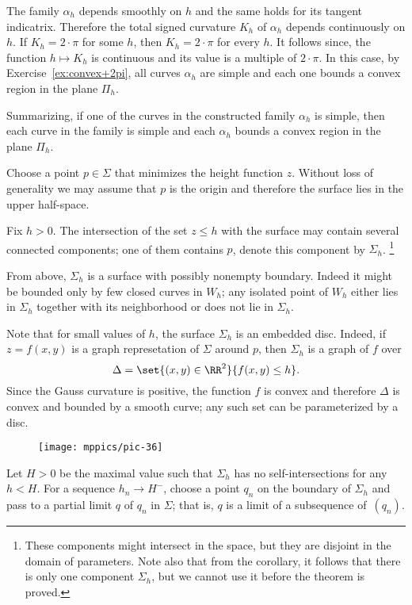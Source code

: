 The family $\alpha_h$ depends smoothly on $h$ and the same holds for its tangent indicatrix.
Therefore the total signed curvature $K_h$ of $\alpha_h$ depends continuously on $h$.
If $K_h=2\cdot\pi$ for some $h$, then $K_h=2\cdot\pi$ for every $h$.
It follows since, the function $h\mapsto K_h$ is continuous and its value is a multiple of $2\cdot\pi$.
In this case, by Exercise~\ref{ex:convex+2pi}, all curves $\alpha_h$ are simple and each one bounds a convex region in the plane $\Pi_h$.

Summarizing, if one of the curves in the constructed family $\alpha_{h}$ is simple,
then each curve in the family is simple and each $\alpha_{h}$ bounds a convex region in the plane $\Pi_h$. 

Choose a point $p\in \Sigma$ that minimizes the height function $z$.
Without loss of generality we may assume that $p$ is the origin and therefore the surface lies in the upper half-space.

Fix $h>0$.
The intersection of the set $z\le h$ with the surface may contain several connected components;
one of them contains $p$, denote this component by $\Sigma_h$.%
\footnote{These components might intersect in the space, but they are disjoint in the domain of parameters.
Note also that from the corollary, it follows that there is only one component $\Sigma_h$, but we cannot use it before the theorem is proved.}


From above, $\Sigma_h$ is a surface with possibly nonempty boundary.
Indeed it might be bounded only by few closed curves in $W_h$;
any isolated point of $W_h$ either lies in $\Sigma_h$ together with its neighborhood or does not lie in $\Sigma_h$.


Note that for small values of $h$, the surface $\Sigma_h$ is an embedded disc.
Indeed, if $z=f(x,y)$ is a graph represetation of $\Sigma$ around $p$,
then $\Sigma_h$ is a graph of $f$ over 
\[\Delta=\set{(x,y)\in\RR^2}{f(x,y)\le h}.\]
Since the Gauss curvature is positive, the function $f$ is convex and therefore $\Delta$ is convex and bounded by a smooth curve;
any such set can be parameterized by a disc.

\begin{wrapfigure}{o}{30 mm}
\vskip-0mm
\centering
\texttt{[image: mppics/pic-36]}
\vskip-0mm
\end{wrapfigure}

Let $H>0$ be the maximal value such that $\Sigma_h$ has no self-intersections for any $h<H$.
For a sequence $h_n\to H^-$, choose a point $q_n$ on the boundary of $\Sigma_h$ and pass to a partial limit $q$ of $q_n$ in $\Sigma$;
that is, $q$ is a limit of a subsequence of~$(q_n)$.

